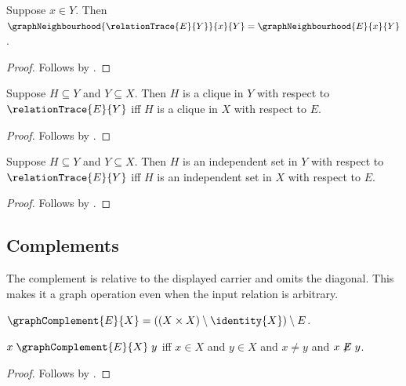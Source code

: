 \begin{proposition}\label{induced_graph_neighbourhood}
    Suppose $x\in Y$.
    Then $\graphNeighbourhood{\relationTrace{E}{Y}}{x}{Y}=
        \graphNeighbourhood{E}{x}{Y}$.
\end{proposition}
\begin{proof}
    Follows by
        .
\end{proof}

\begin{proposition}\label{induced_clique_iff}
    Suppose $H\subseteq Y$ and $Y\subseteq X$.
    Then $H$ is a clique in $Y$ with respect to $\relationTrace{E}{Y}$ iff
        $H$ is a clique in $X$ with respect to $E$.
\end{proposition}
\begin{proof}
    Follows by
        .
\end{proof}

\begin{proposition}\label{induced_independent_iff}
    Suppose $H\subseteq Y$ and $Y\subseteq X$.
    Then $H$ is an independent set in $Y$ with respect to
            $\relationTrace{E}{Y}$ iff
        $H$ is an independent set in $X$ with respect to $E$.
\end{proposition}
\begin{proof}
    Follows by
        .
\end{proof}

\subsection{Complements}

The complement is relative to the displayed carrier and omits the diagonal.
This makes it a graph operation even when the input relation is arbitrary.

\begin{definition}\label{graph_complement}
    $\graphComplement{E}{X}=
        ((X\times X)\setminus\identity{X})\setminus E$.
\end{definition}

\begin{proposition}\label{graph_complement_iff}
    $x\mathrel{\graphComplement{E}{X}}y$ iff
        $x\in X$ and $y\in X$ and $x\neq y$ and $x\not\mathrel{E}y$.
\end{proposition}
\begin{proof}
    Follows by
        .
\end{proof}

